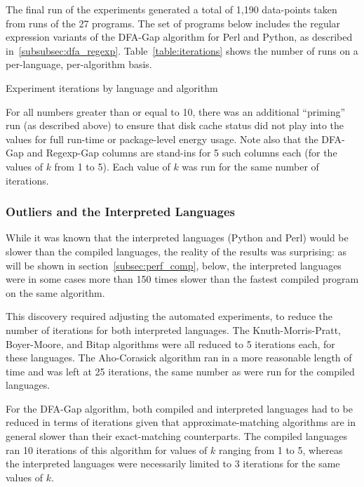 The final run of the experiments generated a total of 1,190 data-points taken from runs of the 27 programs. The set of programs below includes the regular expression variants of the DFA-Gap algorithm for Perl and Python, as described in~\ref{subsubsec:dfa_regexp}. Table~\ref{table:iterations} shows the number of runs on a per-language, per-algorithm basis.

\begin{table}[h!]
\begin{center}

\caption{Experiment iterations by language and algorithm}
\label{table:iterations}
\end{center}
\end{table}

For all numbers greater than or equal to 10, there was an additional ``priming'' run (as described above) to ensure that disk cache status did not play into the values for full run-time or package-level energy usage. Note also that the DFA-Gap and Regexp-Gap columns are stand-ins for 5 such columns each (for the values of $k$ from 1 to 5). Each value of $k$ was run for the same number of iterations.

\subsubsection{Outliers and the Interpreted Languages}

While it was known that the interpreted languages (Python and Perl) would be slower than the compiled languages, the reality of the results was surprising: as will be shown in section~\ref{subsec:perf_comp}, below, the interpreted languages were in some cases more than 150 times slower than the fastest compiled program on the same algorithm.

This discovery required adjusting the automated experiments, to reduce the number of iterations for both interpreted languages. The Knuth-Morris-Pratt, Boyer-Moore, and Bitap algorithms were all reduced to 5 iterations each, for these languages. The Aho-Corasick algorithm ran in a more reasonable length of time and was left at 25 iterations, the same number as were run for the compiled languages.

For the DFA-Gap algorithm, both compiled and interpreted languages had to be reduced in terms of iterations given that approximate-matching algorithms are in general slower than their exact-matching counterparts. The compiled languages ran 10 iterations of this algorithm for values of $k$ ranging from 1 to 5, whereas the interpreted languages were necessarily limited to 3 iterations for the same values of $k$.


